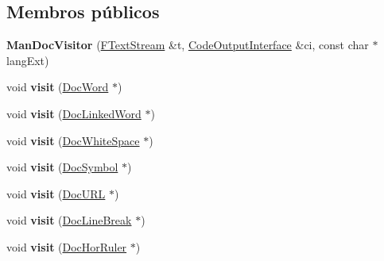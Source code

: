 \subsection*{Membros públicos}
\begin{DoxyCompactItemize}
\item 
\hypertarget{class_man_doc_visitor_aae8c3a5f8e8c4c5fd1fcecbb84c59e29}{{\bfseries Man\-Doc\-Visitor} (\hyperlink{class_f_text_stream}{F\-Text\-Stream} \&t, \hyperlink{class_code_output_interface}{Code\-Output\-Interface} \&ci, const char $\ast$lang\-Ext)}\label{class_man_doc_visitor_aae8c3a5f8e8c4c5fd1fcecbb84c59e29}

\item 
\hypertarget{class_man_doc_visitor_ac60f6c2f041b955124e3ba6b63111ca5}{void {\bfseries visit} (\hyperlink{class_doc_word}{Doc\-Word} $\ast$)}\label{class_man_doc_visitor_ac60f6c2f041b955124e3ba6b63111ca5}

\item 
\hypertarget{class_man_doc_visitor_ab957281f81eaa9db582ac66f014ef342}{void {\bfseries visit} (\hyperlink{class_doc_linked_word}{Doc\-Linked\-Word} $\ast$)}\label{class_man_doc_visitor_ab957281f81eaa9db582ac66f014ef342}

\item 
\hypertarget{class_man_doc_visitor_a8e427da6441fcfec76f860101da1b132}{void {\bfseries visit} (\hyperlink{class_doc_white_space}{Doc\-White\-Space} $\ast$)}\label{class_man_doc_visitor_a8e427da6441fcfec76f860101da1b132}

\item 
\hypertarget{class_man_doc_visitor_aba7904fef0b15b1ff249f41815d3b739}{void {\bfseries visit} (\hyperlink{class_doc_symbol}{Doc\-Symbol} $\ast$)}\label{class_man_doc_visitor_aba7904fef0b15b1ff249f41815d3b739}

\item 
\hypertarget{class_man_doc_visitor_a38b6defe4c1e4aa2fb6bbc944f58f93c}{void {\bfseries visit} (\hyperlink{class_doc_u_r_l}{Doc\-U\-R\-L} $\ast$)}\label{class_man_doc_visitor_a38b6defe4c1e4aa2fb6bbc944f58f93c}

\item 
\hypertarget{class_man_doc_visitor_a1719b7dfc3a83b7976ff5997f56cd474}{void {\bfseries visit} (\hyperlink{class_doc_line_break}{Doc\-Line\-Break} $\ast$)}\label{class_man_doc_visitor_a1719b7dfc3a83b7976ff5997f56cd474}

\item 
\hypertarget{class_man_doc_visitor_aeed3d42f5e96c4016fbc6ab678f5549a}{void {\bfseries visit} (\hyperlink{class_doc_hor_ruler}{Doc\-Hor\-Ruler} $\ast$)}\label{class_man_doc_visitor_aeed3d42f5e96c4016fbc6ab678f5549a}


\end{DoxyCompactItemize}

